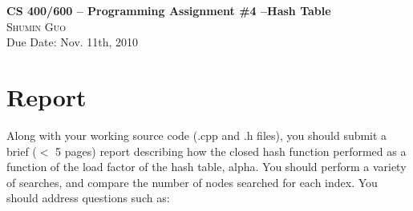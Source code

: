 \documentclass{article}
\begin{document}
\begin{center}
\textbf{{\Large CS 400/600 – Programming Assignment \#4 –Hash Table}} \\
\textsc{Shumin Guo} \\
\small{Due Date: Nov. 11th, 2010}
\end{center}

\section*{Report}
Along with your working source code (.cpp and .h files), you should
submit a brief ($<$ 5 pages) report describing how the closed hash
function performed as a function of the load factor of the hash table,
alpha. You should perform a variety of searches, and compare the
number of nodes searched for each index.  You should address questions
such as: 
\end{document}
